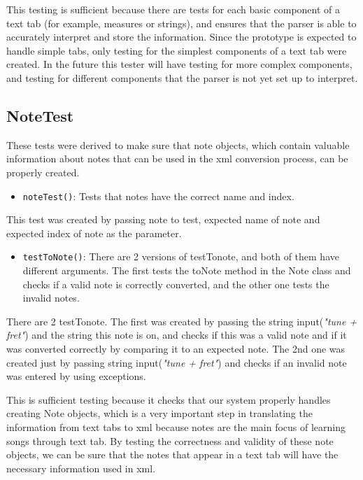 \documentclass[11pt]{article}
\begin{document}
This testing is sufficient because there are tests for each basic component of a text tab (for example, measures or strings), and ensures that the parser is able to accurately interpret and store the information. Since the prototype is expected to handle simple tabs, only testing for the simplest components of a text tab were created. In the future this tester will have testing for more complex components, and testing for different components that the parser is not yet set up to interpret.
\subsection{NoteTest}
\label{sec:org1de8385}
These tests were derived to make sure that note objects, which contain valuable information about notes that can be used in the xml conversion process, can be properly created. 
\begin{itemize}
\item \texttt{noteTest()}: Tests that notes have the correct name and index.
\end{itemize}
This test was created by passing note to test, expected name of note and expected index of note as the parameter.
\begin{itemize}
\item \texttt{testToNote()}: There are 2 versions of testTonote, and both of them have different arguments. The first tests the toNote method in the Note class and checks if a valid note is correctly converted, and the other one tests the invalid notes.
\end{itemize}
There are 2 testTonote. The first was created by passing the string input(\emph{"tune + fret"}) and the string this note is on, and checks if this was a valid note and if it was converted correctly by comparing it to an expected note. The 2nd one was created just by passing string input(\emph{"tune + fret"}) and checks if an invalid note was entered by using exceptions.

This is sufficient testing because it checks that our system properly handles creating Note objects, which is a very important step in translating the information from text tabs to xml because notes are the main focus of learning songs through text tab. By testing the correctness and validity of these note objects, we can be sure that the notes that appear in a text tab will have the necessary information used in xml.
\end{document}
